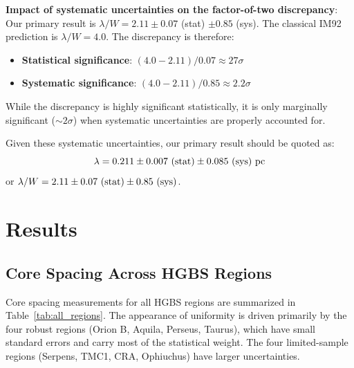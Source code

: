 \documentclass[11pt,a4paper]{article}
\begin{document}
\textbf{Impact of systematic uncertainties on the factor-of-two discrepancy}: Our primary result is $\lambda/W = 2.11 \pm 0.07$ (stat) $\pm 0.85$ (sys). The classical IM92 prediction is $\lambda/W = 4.0$. The discrepancy is therefore:
\begin{itemize}
    \item \textbf{Statistical significance}: $(4.0 - 2.11) / 0.07 \approx 27\sigma$
    \item \textbf{Systematic significance}: $(4.0 - 2.11) / 0.85 \approx 2.2\sigma$
\end{itemize}
While the discrepancy is highly significant statistically, it is only marginally significant ($\sim2\sigma$) when systematic uncertainties are properly accounted for.

Given these systematic uncertainties, our primary result should be quoted as:
\begin{equation}
\lambda = 0.211 \pm 0.007~({\rm stat}) \pm 0.085~({\rm sys})~{\rm pc}
\end{equation}
or $\lambda/W = 2.11 \pm 0.07~({\rm stat}) \pm 0.85~({\rm sys})$.

\section{Results}
\label{sec:results}

\subsection{Core Spacing Across HGBS Regions}

Core spacing measurements for all HGBS regions are summarized in Table~\ref{tab:all_regions}. The appearance of uniformity is driven primarily by the four robust regions (Orion B, Aquila, Perseus, Taurus), which have small standard errors and carry most of the statistical weight. The four limited-sample regions (Serpens, TMC1, CRA, Ophiuchus) have larger uncertainties.
\end{document}
